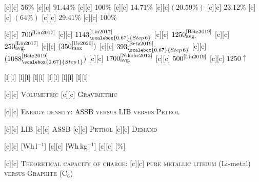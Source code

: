 [c][c] {\tiny $56\%$}
[c][c] {\tiny $91.44\%$}
[c][c] {\tiny $100\%$}
[c][c] {\tiny $14.71\%$}
[c][c]{\tiny $(20.59\%)$}
[c][c] {\tiny $23.12\%$}
[c][c] {\tiny $(64\%)$}
[c][c] {\tiny $29.41\%$}
[c][c] {\tiny $100\%$}

[c][c] {\tiny $700^{\text{\cite{Lin2017}}}$}
[c][c] {\tiny $1143^{\text{\cite{Lin2017}}}_{\scalebox{0.67}{Step\,6}}$}
[c][c] {\tiny $1250^{\text{\cite{Betz2019}}}_{\text{avg.}}$}
[c][c] {\tiny $250^{\text{\cite{Lin2017}}}_{\text{avg.}}$}
[c][c] {\tiny $(350^{\text{\cite{Ue2020}}}_{\max})$}
[c][c] {\tiny $ 393^{\text{\cite{Betz2019}}}_{\scalebox{0.67}{Step\,6}}$}
[c][c] {\tiny $(1088^{\text{\cite{Betz2019}}}_{\scalebox{0.67}{Step\,1}})$}
[c][c] {\tiny $1700^{\text{\cite{Nikolic2012}}}_{\text{avg.}}$}
[c][c] {\tiny $500^{\text{\cite{Liu2019}}}$}
[c][c] {\tiny $1250\!\uparrow$}

[l][l] {}
[l][l] {}
[l][l] {}
[l][l] {}
[l][l] {}
[l][l] {}

[c][c] {\tiny \textsc{Volumetric}}
[c][c] {\tiny \textsc{Gravimetric}}

[c][c] {\scriptsize
	\textsc{Energy density}: ASSB \textsc{versus} LIB \textsc{versus} \textsc{Petrol}}

[c][c] {\scriptsize LIB}
[c][c] {\scriptsize ASSB}
[c][c] {\scriptsize \textsc{Petrol}}
[c][c] {\scriptsize \textsc{Demand}}

[c][c] {\tiny [Wh\,l$^{-1}$]}
[c][c] {\tiny [Wh\,kg$^{-1}$]}
[c][c] {\tiny [$\%$]}

[c][c]  {\scriptsize \textsc{Theoretical capacity of charge}:}
[c][c] {\scriptsize
	\textsc{pure} \textsc{metallic lithium} (Li-metal)
	\textsc{versus Graphite (C$_{6}$)}}


